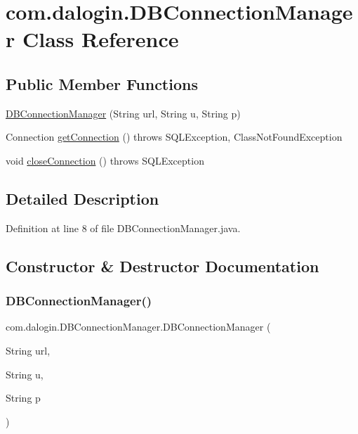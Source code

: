 \hypertarget{classcom_1_1dalogin_1_1_d_b_connection_manager}{}\section{com.\+dalogin.\+D\+B\+Connection\+Manager Class Reference}
\label{classcom_1_1dalogin_1_1_d_b_connection_manager}
\subsection*{Public Member Functions}
\begin{DoxyCompactItemize}
\item 
\hyperlink{classcom_1_1dalogin_1_1_d_b_connection_manager_ababd94588891ef6b9ba6ce6aa06b87e7}{D\+B\+Connection\+Manager} (String url, String u, String p)
\item 
Connection \hyperlink{classcom_1_1dalogin_1_1_d_b_connection_manager_a36917ade7183181ab00d32c126915db7}{get\+Connection} ()  throws S\+Q\+L\+Exception, Class\+Not\+Found\+Exception
\item 
void \hyperlink{classcom_1_1dalogin_1_1_d_b_connection_manager_a525be4a64e02f21c1b4bd1d53ca73cc0}{close\+Connection} ()  throws S\+Q\+L\+Exception
\end{DoxyCompactItemize}


\subsection{Detailed Description}


Definition at line 8 of file D\+B\+Connection\+Manager.\+java.



\subsection{Constructor \& Destructor Documentation}
\mbox{\label{classcom_1_1dalogin_1_1_d_b_connection_manager_ababd94588891ef6b9ba6ce6aa06b87e7}} 
\subsubsection{\texorpdfstring{D\+B\+Connection\+Manager()}{DBConnectionManager()}}
{\footnotesize\ttfamily com.\+dalogin.\+D\+B\+Connection\+Manager.\+D\+B\+Connection\+Manager (\begin{DoxyParamCaption}\item[{String}]{url,  }\item[{String}]{u,  }\item[{String}]{p }\end{DoxyParamCaption})}



